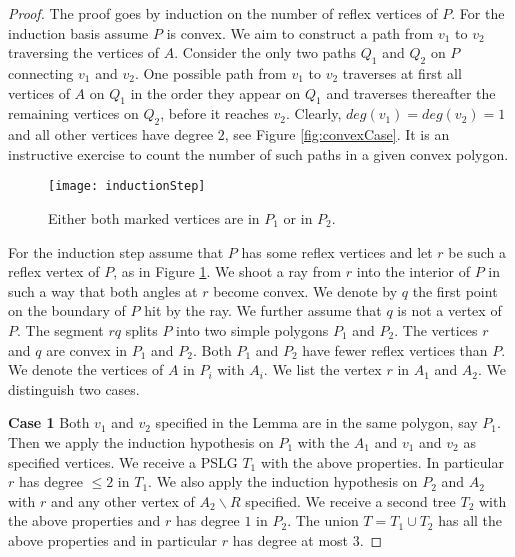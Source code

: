 \documentclass[12pt]{article}
\begin{document}
\begin{proof}
	The proof goes by induction on the number of reflex vertices of $P$.
	For the induction basis assume $P$ is convex. 
	We aim to construct a path from $v_1$ to $v_2$ traversing
	the vertices of $A$. Consider the only two paths $Q_1$ and $Q_2$ on $P$ connecting 
	$v_1$ and $v_2$. One possible path from 
	$v_1$ to $v_2$ traverses at first all vertices of $A$ on $Q_1$ in the order 
	they appear on $Q_1$ and traverses thereafter the remaining vertices on $Q_2$,
	before it reaches $v_2$.
	Clearly, $deg(v_1) = deg(v_2) = 1$ and all other vertices have degree $2$, see Figure \ref{fig:convexCase}. 	It is an instructive exercise to count the number of such paths in a given convex polygon.
	\begin{figure}[h]
			\begin{center}
			\texttt{[image: inductionStep]}
				\caption{Either both marked vertices are in $P_1$ or in $P_2$.}
				\label{fig:inductionStep}
			\end{center}
	\end{figure} 
	
	For the induction step assume that $P$ has some reflex vertices and let $r$ be such a reflex vertex of $P$, as in Figure \ref{fig:inductionStep}. We shoot a ray from $r$ into the interior of $P$ in such a way that both angles at $r$ become convex. We denote by $q$ the first point on the boundary of $P$  hit by the ray. We further assume that $q$ is not a vertex of $P$. The segment $rq$ splits $P$ into two simple polygons $P_1$ and $P_2$. The vertices $r$ and $q$ are convex in $P_1$ and $P_2$. Both $P_1$ and $P_2$ have fewer reflex vertices than $P$. We denote the vertices of $A$ in $P_i$ with $A_i$. We list the vertex $r$ in $A_1$ and $A_2$. We distinguish two cases. 
	
	\textbf{Case 1} Both $v_1$ and $v_2$ specified in the Lemma are in the same polygon, say $P_1$. Then we apply the induction hypothesis on $P_1$ with the $A_1$ and $v_1$ and $v_2$ as specified vertices. We receive a PSLG $T_1$ with the above properties. In particular $r$ has degree $\leq 2$ in $T_1$. We also apply the induction hypothesis on $P_2$ and $A_2$ with $r$ and any other vertex of $A_2\backslash R$ specified. We receive a second tree $T_2$ with the above properties and $r$ has degree $1$ in $P_2$. The union $T = T_1 \cup T_2$ has all the above properties and in particular $r$ has degree at most $3$.
	

\end{proof}
\end{document}
